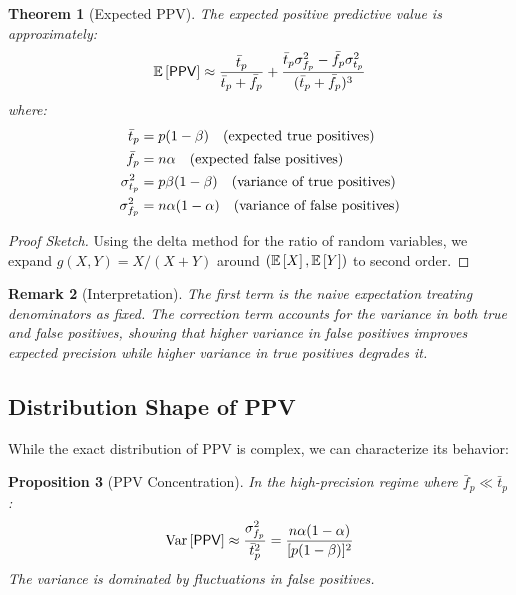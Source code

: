 \documentclass[11pt,final,hidelinks]{article}
\newtheorem{theorem}{Theorem}[section]
\newtheorem{proposition}[theorem]{Proposition}
\newtheorem{remark}[theorem]{Remark}
\newcommand{\PPV}{\mathsf{PPV}}  %
\begin{document}
\begin{theorem}[Expected PPV]
\label{thm:expected-ppv}
The expected positive predictive value is approximately:
\begin{equation}
\Expect{\PPV} \approx \frac{\bar{t}_p}{\bar{t}_p + \bar{f}_p} + \frac{\bar{t}_p \sigma_{f_p}^2 - \bar{f}_p \sigma_{t_p}^2}{(\bar{t}_p + \bar{f}_p)^3}
\end{equation}
where:
\begin{align}
\bar{t}_p &= p(1-\beta) \quad \text{(expected true positives)} \\
\bar{f}_p &= n\alpha \quad \text{(expected false positives)} \\
\sigma_{t_p}^2 &= p\beta(1-\beta) \quad \text{(variance of true positives)} \\
\sigma_{f_p}^2 &= n\alpha(1-\alpha) \quad \text{(variance of false positives)}
\end{align}
\end{theorem}

\begin{proof}[Proof Sketch]
Using the delta method for the ratio of random variables, we expand $g(X,Y) = X/(X+Y)$ around $(\mathbb{E}\left[X\right], \mathbb{E}\left[Y\right])$ to second order.
\end{proof}

\begin{remark}[Interpretation]
The first term is the naive expectation treating denominators as fixed. The correction term accounts for the variance in both true and false positives, showing that higher variance in false positives improves expected precision while higher variance in true positives degrades it.
\end{remark}

\subsection{Distribution Shape of PPV}

While the exact distribution of PPV is complex, we can characterize its behavior:

\begin{proposition}[PPV Concentration]
In the high-precision regime where $\bar{f}_p \ll \bar{t}_p$:
\begin{equation}
\Var{\PPV} \approx \frac{\sigma_{f_p}^2}{\bar{t}_p^2} = \frac{n\fprate(1-\fprate)}{[p(1-\fnrate)]^2}
\end{equation}
The variance is dominated by fluctuations in false positives.
\end{proposition}
\end{document}
